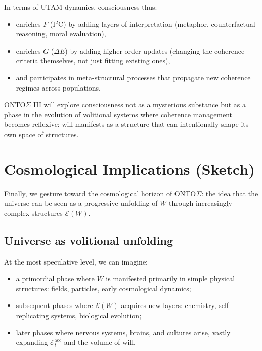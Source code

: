\documentclass[12pt,a4paper]{report}
\newcommand{\Will}{W}
\begin{document}
In terms of UTAM dynamics, consciousness thus:

\begin{itemize}[leftmargin=2em]
    \item enriches \(F\) (I$^2$C) by adding layers of interpretation (metaphor, counterfactual reasoning, moral evaluation),
    \item enriches \(G\) ($\Delta E$) by adding higher-order updates (changing the coherence criteria themselves, not just fitting existing ones),
    \item and participates in meta-structural processes that propagate new coherence regimes across populations.
\end{itemize}

ONTO$\Sigma$ III will explore consciousness not as a mysterious substance but as a phase in the evolution of volitional systems where coherence management becomes reflexive: will manifests as a structure that can intentionally shape its own space of structures.

\section{Cosmological Implications (Sketch)}

Finally, we gesture toward the cosmological horizon of ONTO$\Sigma$: the idea that the universe can be seen as a progressive unfolding of \(\Will\) through increasingly complex structures \(\mathcal{E}(\Will)\).

\subsection*{Universe as volitional unfolding}

At the most speculative level, we can imagine:

\begin{itemize}[leftmargin=2em]
    \item a primordial phase where \(\Will\) is manifested primarily in simple physical structures: fields, particles, early cosmological dynamics;
    \item subsequent phases where \(\mathcal{E}(\Will)\) acquires new layers: chemistry, self-replicating systems, biological evolution;
    \item later phases where nervous systems, brains, and cultures arise, vastly expanding \(\mathcal{E}_t^{\mathrm{acc}}\) and the volume of will.
\end{itemize}
\end{document}
